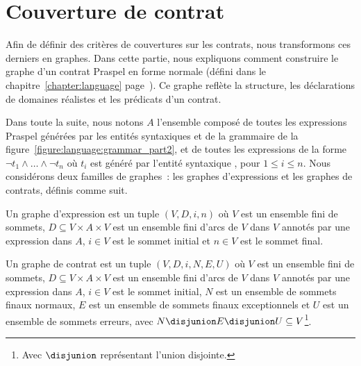 \section{Couverture de contrat}
\label{section:test:contract}

Afin de définir des critères de couvertures sur les contrats, nous transformons
ces derniers en graphes. Dans cette partie, nous expliquons comment construire
le graphe d'un contrat Praspel en forme normale (défini dans le
chapitre~\ref{chapter:language} page~\pageref{chapter:language}). Ce graphe
reflète la structure, les déclarations de domaines réalistes et les prédicats
d'un contrat.

Dans toute la suite, nous notons $A$ l'ensemble composé de toutes les
expressions Praspel générées par les entités syntaxiques  et
 de la grammaire de la
figure~\ref{figure:language:grammar_part2}, et de toutes les expressions de la
forme $\neg t_1 \land \dots \land \neg t_n$ où $t_i$ est généré par l'entité
syntaxique , pour $1 \leq i \leq n$. Nous considérons deux
familles de graphes~: les {\strong graphes d'expressions} et les {\strong
graphes de contrats}, définis comme suit.

\begin{definition}

Un {\strong graphe d'expression} est un tuple $(V, D, i, n)$ où $V$ est un
ensemble fini de {\strong sommets}, $D \subseteq V \times A \times V$ est un
ensemble fini d'{\strong arcs} de $V$ dans $V$ annotés par une {\strong
expression} dans $A$, $i \in V$ est le {\strong sommet initial} et $n \in V$ est
le {\strong sommet final}.

\end{definition}

\begin{definition}

Un {\strong graphe de contrat} est un tuple $(V, D, i, N, E, U)$ où $V$ est un
ensemble fini de {\strong sommets}, $D \subseteq V \times A \times V$ est un
ensemble fini d'{\strong arcs} de $V$ dans $V$ annotés par une expression dans
$A$, $i \in V$ est le {\strong sommet initial}, $N$ est un ensemble de {\strong
sommets finaux normaux}, $E$ est un ensemble de {\strong sommets finaux
exceptionnels} et $U$ est un ensemble de {\strong sommets erreurs}, avec $N
\disjunion E \disjunion U \subseteq V$\footnote{Avec $\disjunion$ représentant
l'union disjointe.}.

\end{definition}

